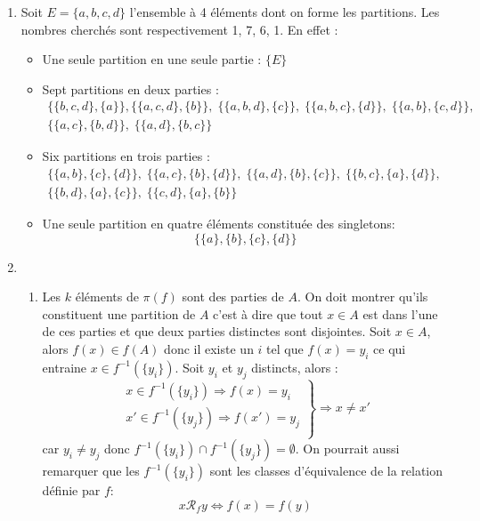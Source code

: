 \begin{enumerate}
 \item Soit $E=\{a,b,c,d\}$ l'ensemble à 4 éléments dont on forme les partitions. Les nombres cherchés sont respectivement 1, 7, 6, 1. En effet :
\begin{itemize}
 \item Une seule partition en une seule partie : $\{E\}$ 
 \item Sept partitions en deux parties :
\begin{multline*}
 \{\{b,c,d\},\{a\}\},\{\{a,c,d\},\{b\}\},\; \{\{a,b,d\},\{c\}\},\; \{\{a,b,c\},\{d\}\},\; \{\{a,b\},\{c,d\}\},\;\\
 \{\{a,c\},\{b,d\}\},\; \{\{a,d\},\{b,c\}\} 
\end{multline*}
 
 \item Six partitions en trois parties :
\begin{multline*}
\{\{a,b\},\{c\},\{d\}\},\; \{\{a,c\},\{b\},\{d\}\},\; \{\{a,d\},\{b\},\{c\}\},\; \{\{b,c\},\{a\},\{d\}\},\;\\
\{\{b,d\},\{a\},\{c\}\},\; \{\{c,d\},\{a\},\{b\}\}  
\end{multline*}
 
 \item Une seule partition en quatre éléments constituée des singletons: 
\begin{displaymath}
  \{\{a\}, \{b\}, \{c\}, \{d\}\}
\end{displaymath}     
\end{itemize}
 
 \item
\begin{enumerate}
 \item Les $k$ éléments de $\pi(f)$ sont des parties de $A$. On doit montrer qu'ils constituent une partition de $A$ c'est à dire que tout $x\in A$ est dans l'une de ces parties et que deux parties distinctes sont disjointes.\newline
Soit $x\in A$, alors $f(x)\in f(A)$ donc il existe un $i$ tel que $f(x)=y_i$ ce qui entraine $x\in f^{-1}(\{y_i\})$.\newline
Soit $y_i$ et $y_j$ distincts, alors :
\begin{displaymath}
 \left. 
\begin{aligned}
x \in f^{-1}(\{y_i\})\Rightarrow f(x)=y_i \\ 
x' \in f^{-1}(\{y_j\})\Rightarrow f(x')=y_j \\
\end{aligned}
\right\rbrace \Rightarrow x \neq x'
\end{displaymath}
car $y_i\neq y_j$ donc $f^{-1}(\{y_i\})\cap f^{-1}(\{y_j\})=\emptyset$.\newline
On pourrait aussi remarquer que les $f^{-1}(\{y_i\})$ sont les classes d'équivalence de la relation définie par $f$:
\begin{displaymath}
  x \mathcal{R}_f y \Leftrightarrow f(x) = f(y)
\end{displaymath}


\end{enumerate}
\end{enumerate}
